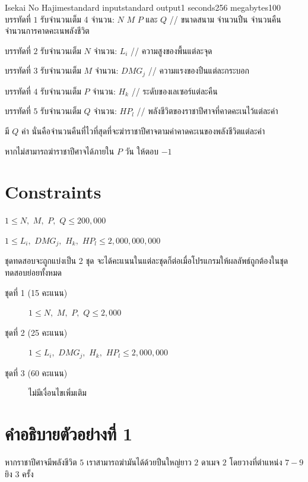 \documentclass[11pt,a4paper]{article}
\begin{document}
\begin{problem}{Isekai No Hajime}{standard input}{standard output}{1 seconds}{256 megabytes}{100}
\InputFile
บรรทัดที่ $1$ รับจำนวนเต็ม 4 จำนวน: $N$ $M$ $P$ และ $Q$ // ขนาดสนาม จำนวนปืน จำนวนคืน จำนวนการคาดคะเนพลังชีวิต

บรรทัดที่ $2$ รับจำนวนเต็ม $N$ จำนวน: $L_i$ // ความสูงของพื้นแต่ละจุด

บรรทัดที่ $3$ รับจำนวนเต็ม $M$ จำนวน: $DMG_j$ // ความแรงของปืนแต่ละกระบอก

บรรทัดที่ $4$ รับจำนวนเต็ม $P$ จำนวน: $H_k$ // ระดับของเลเซอร์แต่ละคืน

บรรทัดที่ $5$ รับจำนวนเต็ม $Q$ จำนวน: $HP_l$ // พลังชีวิตของราชาปีศาจที่คาดคะเนไว้แต่ละค่า

\OutputFile
มี $Q$ ค่า นั่นคือจำนวนคืนที่ไวที่สุดที่จะฆ่าราชาปีศาจตามค่าคาดคะเนของพลังชีวิตแต่ละค่า

หากไม่สามารถฆ่าราชาปีศาจได้ภายใน $P$ วัน ให้ตอบ $-1$

\section*{Constraints}

$1 \leq N,$ $M,$ $P,$ $Q \leq 200,000$

$1 \leq L_i,$ $DMG_j,$ $H_k,$ $HP_l \leq 2,000,000,000$
  
\Scoring
ชุดทดสอบจะถูกแบ่งเป็น 2 ชุด จะได้คะแนนในแต่ละชุดก็ต่อเมื่อโปรแกรมให้ผลลัพธ์ถูกต้องในชุดทดสอบย่อยทั้งหมด

\begin{description}

\item[ชุดที่ 1 (15 คะแนน)]  $1 \leq N,$ $M,$ $P,$ $Q \leq 2,000$ 

\item[ชุดที่ 2 (25 คะแนน)]  $1 \leq L_i,$ $DMG_j,$ $H_k,$ $HP_l \leq 2,000,000$

\item[ชุดที่ 3 (60 คะแนน)] ไม่มีเงื่อนไขเพิ่มเติม

\end{description}

\Examples

\begin{example}
%
%
\end{example}

\section*{คำอธิบายตัวอย่างที่ 1}
หากราชาปีศาจมีพลังชีวิต $5$ เราสามารถฆ่ามันได้ด้วยปืนใหญ่ยาว $2$ ดาเมจ $2$ โดยวางที่ตำแหน่ง $7 - 9$ ยิง $3$ ครั้ง


\end{problem}
\end{document}
